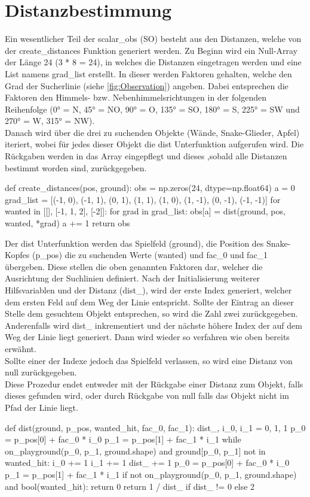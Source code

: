 \section{Distanzbestimmung} \label{sec:Anhang-Implementierung-Distanzen}
Ein wesentlicher Teil der scalar\_obs (SO) besteht aus den Distanzen, welche von der create\_distances Funktion generiert werden. Zu Beginn wird ein Null-Array der Länge 24 (3 * 8 = 24), in welches die Distanzen eingetragen werden und eine List namens grad\_list erstellt. In dieser werden Faktoren gehalten, welche den Grad der Sucherlinie (siehe \ref{fig:Observation}) angeben. Dabei entsprechen die Faktoren den Himmels- bzw. Nebenhimmelsrichtungen in der folgenden Reihenfolge (0° = N, 45° = NO, 90° = O, 135° = SO, 180° = S, 225° = SW und 270° = W, 315° = NW).\\
Danach wird über die drei zu suchenden Objekte (Wände, Snake-Glieder, Apfel) iteriert, wobei für jedes dieser Objekt die dist Unterfunktion aufgerufen wird. Die Rückgaben werden in das Array eingepflegt und dieses ,sobald alle Distanzen bestimmt worden sind, zurückgegeben.
\begin{python}
	def create_distances(pos, ground):
		obs = np.zeros(24, dtype=np.float64)
		a = 0
		grad_list = [(-1, 0), (-1, 1), (0, 1), (1, 1), (1, 0), (1, -1), (0, -1), (-1, -1)]
		for wanted in [[], [-1, 1, 2], [-2]]:
			for grad in grad_list:
				obs[a] = dist(ground, pos, wanted, *grad)
				a += 1
		return obs
\end{python}
Der dist Unterfunktion werden das Spielfeld (ground), die Position des Snake-Kopfes (p\_pos) die zu suchenden Werte (wanted) und fac\_0 und fac\_1 übergeben. Diese stellen die oben genannten Faktoren dar, welcher die Ausrichtung der Suchlinien definiert.
Nach der Initialisierung weiterer Hilfsvariablen und der Distanz (dist\_), wird der erste Index generiert, welcher dem ersten Feld auf dem Weg der Linie entspricht. Sollte der Eintrag an dieser Stelle dem gesuchtem Objekt entsprechen, so wird die Zahl zwei zurückgegeben. Anderenfalls wird dist\_ inkrementiert und der nächste höhere Index der auf dem Weg der Linie liegt generiert. Dann wird wieder so verfahren wie oben bereits erwähnt.\\
Sollte einer der Indexe jedoch das Spielfeld verlassen, so wird eine Distanz von null zurückgegeben.\\
Diese Prozedur endet entweder mit der Rückgabe einer Distanz zum Objekt, falls dieses gefunden wird, oder durch Rückgabe von null falls das Objekt nicht im Pfad der Linie liegt. 
\begin{python}
	def dist(ground, p_pos, wanted_hit, fac_0, fac_1):
		dist_, i_0, i_1 = 0, 1, 1
		p_0 = p_pos[0] + fac_0 * i_0
		p_1 = p_pos[1] + fac_1 * i_1
		while on_playground(p_0, p_1, ground.shape) and ground[p_0, p_1] not in wanted_hit:
			i_0 += 1
			i_1 += 1
			dist_ += 1
			p_0 = p_pos[0] + fac_0 * i_0
			p_1 = p_pos[1] + fac_1 * i_1
		if not on_playground(p_0, p_1, ground.shape) and bool(wanted_hit):
			return 0
		return 1 / dist_ if dist_ != 0 else 2
\end{python} 


